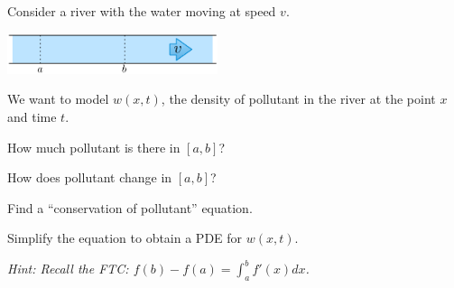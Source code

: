 
\begin{slide}
\question \label{transport}

\begin{problem}
	
Consider a river with the water moving at speed $v$.
\begin{center}
\includegraphics*[width=175pt]{images/river.pdf}
\end{center}

We want to model $w(x,t)$, the density of pollutant in the river at the point $x$ and time $t$.
\end{problem}

\begin{parts}
\item How much pollutant is there in $[a,b]$?
\item How does pollutant change in $[a,b]$?
\item Find a ``conservation of pollutant'' equation.
\item Simplify the equation to obtain a PDE for $w(x,t)$.

\textit{Hint: Recall the FTC: $f(b)-f(a) = \int_a^b f'(x) dx$.}

\end{parts}


\end{slide}


